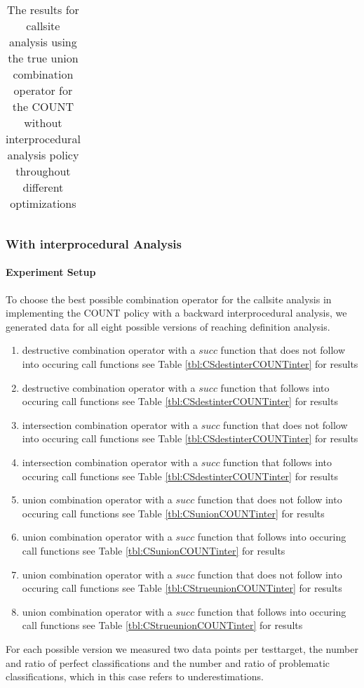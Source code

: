 \begin{table}[!htbp]
{\begin{tabular}{|c|c}
    	\end{tabular}
}
		\caption {The results for callsite analysis using the true union combination operator for the COUNT without interprocedural analysis policy throughout different optimizations}
		\label{tbl:CStrueunionCOUNTnointer}
\end{table}

\newpage

\subsubsection{With interprocedural Analysis}

\paragraph{Experiment Setup}
To choose the best possible combination operator for the callsite analysis in implementing the COUNT policy with a backward interprocedural analysis, we generated data for all eight possible versions of reaching definition analysis.
\begin{enumerate}
\item destructive combination operator with a $succ$ function that does not follow into occuring call functions see Table \ref{tbl:CSdestinterCOUNTinter} for results
\item destructive combination operator with a $succ$ function that follows into occuring call functions see Table \ref{tbl:CSdestinterCOUNTinter} for results
\item intersection combination operator with a $succ$ function that does not follow into occuring call functions see Table \ref{tbl:CSdestinterCOUNTinter} for results
\item intersection combination operator with a $succ$ function that follows into occuring call functions see Table \ref{tbl:CSdestinterCOUNTinter} for results
\item union combination operator with a $succ$ function that does not follow into occuring call functions see Table \ref{tbl:CSunionCOUNTinter} for results
\item union combination operator with a $succ$ function that follows into occuring call functions see Table \ref{tbl:CSunionCOUNTinter} for results
\item union combination operator with a $succ$ function that does not follow into occuring call functions see Table \ref{tbl:CStrueunionCOUNTinter} for results
\item union combination operator with a $succ$ function that follows into occuring call functions see Table \ref{tbl:CStrueunionCOUNTinter} for results
\end{enumerate}
For each possible version we measured two data points per testtarget, the number and ratio of perfect classifications and the number and ratio of problematic classifications, which in this case refers to underestimations.

